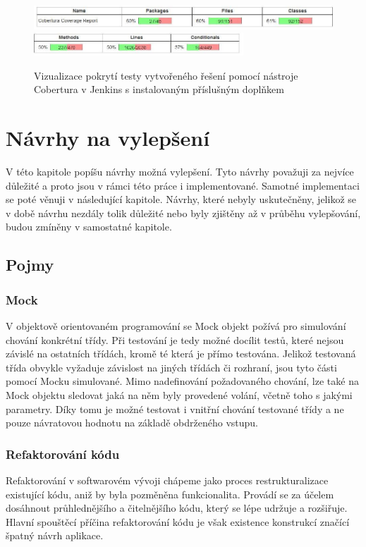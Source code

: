 \documentclass[thesis=B,czech]{FITthesis}[2012/06/26]
\begin{document}
\begin{figure}[h]\centering
 	\includegraphics[width=1.0\textwidth]{resources/cobertura-report-old-1}
 	\includegraphics[width=0.7\textwidth]{resources/cobertura-report-old-2}
	\caption[Pokrytí testy vytvořeného řešení]{Vizualizace pokrytí testy vytvořeného řešení pomocí nástroje Cobertura v
	Jenkins s instalovaným příslušným doplňkem}\label{fig:dp-dia}
\end{figure}


\chapter{Návrhy na vylepšení}
V této kapitole popíšu návrhy možná vylepšení. Tyto návrhy považuji za nejvíce důležité a proto jsou
v rámci této práce i implementované. Samotné implementaci se poté věnuji v následující kapitole. 
Návrhy, které nebyly uskutečněny, jelikož se v době návrhu nezdály tolik důležité nebo byly zjištěny až v průběhu 
vylepšování, budou zmíněny v samostatné kapitole.

\section{Pojmy}

\subsection{Mock}
V objektově orientovaném programování se Mock objekt požívá pro simulování chování konkrétní třídy.\cite{mock}
Při testování je tedy možné docílit testů, které nejsou závislé na ostatních třídách, kromě té která je přímo testována.
Jelikož testovaná třída obvykle vyžaduje závislost na jiných třídách či rozhraní, jsou tyto části pomocí Mocku simulované.
Mimo nadefinování požadovaného chování, lze také na Mock objektu sledovat jaká na něm byly provedené volání, včetně toho
s jakými parametry. Díky tomu je možné testovat i vnitřní chování testované třídy a ne pouze návratovou hodnotu na základě 
obdrženého vstupu.

\subsection{Refaktorování kódu}
Refaktorování v softwarovém vývoji chápeme jako proces restrukturalizace existující kódu, aniž by byla 
pozměněna funkcionalita. Provádí se za účelem dosáhnout průhlednějšího a čitelnějšího kódu, který
se lépe udržuje a rozšiřuje. \cite{refaktoring} Hlavní spouštěcí příčina refaktorování kódu je však existence 
konstrukcí značící špatný návrh aplikace. 
\end{document}
